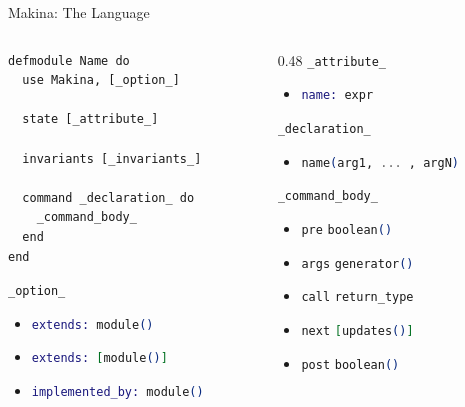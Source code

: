 \documentclass[aspectratio=169, 10pt]{beamer}
\begin{document}
\begin{frame}[label={sec:orgc336b5d},fragile]{Makina: The Language}
 \begin{columns}
\begin{column}{0.48\columnwidth}
\onslide<+->
\lstset{language=elixir,label= ,caption= ,captionpos=b,numbers=none,style=display}
\begin{lstlisting}
defmodule Name do
  use Makina, [_option_]

  state [_attribute_]

  invariants [_invariants_]

  command _declaration_ do
    _command_body_
  end
end
\end{lstlisting}
\vspace{10pt}
\onslide<+->
\lstinline[language=elixir, style=display]~_option_~
\begin{itemize}
\item \lstinline[language=elixir, style=display]~extends: module()~
\item \lstinline[language=elixir, style=display]~extends: [module()]~
\item \lstinline[language=elixir, style=display]~implemented_by: module()~
\end{itemize}
\end{column}

\begin{column}{0.48\columnwidth}
\onslide<+->
\lstinline[language=elixir, style=display]~_attribute_~
\begin{itemize}
\item \lstinline[language=elixir, style=display]~name: expr~
\end{itemize}
\onslide<+->
\vspace{10pt}
\lstinline[language=elixir, style=display]~_declaration_~
\begin{itemize}
\item \lstinline[language=elixir, style=display]~name(arg1, ... , argN)~
\end{itemize}
\onslide<+->
\vspace{10pt}
\lstinline[language=elixir, style=display]~_command_body_~
\begin{itemize}
\item \lstinline[language=elixir, style=display]~pre~    \lstinline[language=elixir, style=display]~boolean()~
\item \lstinline[language=elixir, style=display]~args~   \lstinline[language=elixir, style=display]~generator()~
\item \lstinline[language=elixir, style=display]~call~   \lstinline[language=elixir, style=display]~return_type~
\item \lstinline[language=elixir, style=display]~next~   \lstinline[language=elixir, style=display]~[updates()]~
\item \lstinline[language=elixir, style=display]~post~   \lstinline[language=elixir, style=display]~boolean()~
\end{itemize}
\end{column}
\end{columns}
\end{frame}
\end{document}
